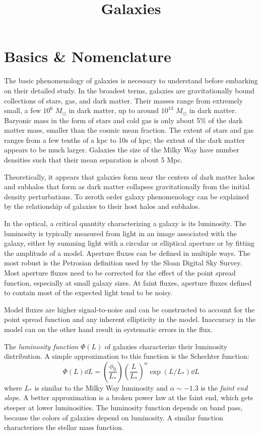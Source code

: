 \title{\bf Galaxies}

\section{Basics \& Nomenclature}

The basic phenomenology of galaxies is necessary to understand before
embarking on their detailed study. In the broadest terms, galaxies are
gravitationally bound collections of stars, gas, and dark
matter. Their masses range from extremely small, a few $10^6$
$M_\odot$ in dark matter, up to around $10^{13}$ $M_\odot$ in dark
matter. Baryonic mass in the form of stars and cold gas is only about
5\% of the dark matter mass, smaller than the cosmic mean
fraction. The extent of stars and gas ranges from a few tenths of a
kpc to 10s of kpc; the extent of the dark matter appears to be much
larger. Galaxies the size of the Milky Way have number densities such
that their mean separation is about 5 Mpc.

Theoretically, it appears that galaxies form near the centers of dark
matter halos and subhalos that form as dark matter collapses
gravitationally from the initial density perturbations. To zeroth
order galaxy phenomenology can be explained by the relationship of
galaxies to their host halos and subhalos.

In the optical, a critical quantity characterizing a galaxy is its
luminosity. The luminosity is typically measured from light in an
image associated with the galaxy, either by summing light with a
circular or elliptical aperture or by fitting the amplitude of a
model. Aperture fluxes can be defined in multiple ways. The most
robust is the Petrosian definition used by the Sloan Digital Sky
Survey. Most aperture fluxes need to be corrected for the effect of
the point spread function, especially at small galaxy sizes. At faint
fluxes, aperture fluxes defined to contain most of the expected light
tend to be noisy.

Model fluxes are higher signal-to-noise and can be constructed to
account for the point spread function and any inherent ellipticity in
the model. Inaccuracy in the model can on the other hand result in
systematic errors in the flux.

The {\it luminosity function} $\Phi(L)$ of galaxies characterize their
luminosity distribution.  A simple approximation to this function is
the Schechter function:
\begin{equation}
\Phi(L) \dd{L} = \left(\frac{\phi_0}{L_\ast}\right)
\left(\frac{L}{L_\ast}\right)^\alpha \exp\left(L / L_\ast\right)
\dd{L}
\end{equation}
where $L_\ast$ is similar to the Milky Way luminosity and $\alpha \sim
-1.3$ is the {\it faint end slope}. A better approximation is a broken
power law at the faint end, which gets steeper at lower
luminosities. The luminosity function depends on band pass, because
the colors of galaxies depend on luminosity. A similar function
characterizes the stellar mass function.


